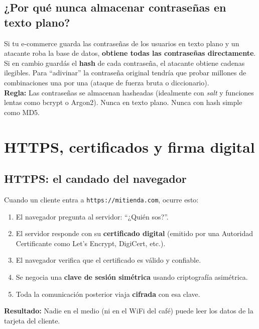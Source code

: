 \documentclass[12pt,a4paper]{article}
\begin{document}
\subsection{¿Por qu\'e nunca almacenar contrase\~nas en texto plano?}

\begin{cajaNota}
Si tu e-commerce guarda las contrase\~nas de los usuarios en texto plano y un atacante roba la base de datos, \textbf{obtiene todas las contrase\~nas directamente}.\\[4pt]
Si en cambio guard\'as el \textbf{hash} de cada contrase\~na, el atacante obtiene cadenas ilegibles. Para ``adivinar'' la contraseña original tendr\'ia que probar millones de combinaciones una por una (ataque de fuerza bruta o diccionario).\\[4pt]
\textbf{Regla:} Las contrase\~nas se almacenan hasheadas (idealmente con \emph{salt} y funciones lentas como bcrypt o Argon2). Nunca en texto plano. Nunca con hash simple como MD5.
\end{cajaNota}

\newpage
\section{HTTPS, certificados y firma digital}

\subsection{HTTPS: el candado del navegador}

\begin{cajaConcepto}[title={¿Qu\'e pasa cuando ves el candadito?}]
Cuando un cliente entra a \texttt{https://mitienda.com}, ocurre esto:
\begin{enumerate}[leftmargin=2em]
  \item El navegador pregunta al servidor: ``¿Qui\'en sos?''.
  \item El servidor responde con su \textbf{certificado digital} (emitido por una Autoridad Certificante como Let's Encrypt, DigiCert, etc.).
  \item El navegador verifica que el certificado es v\'alido y confiable.
  \item Se negocia una \textbf{clave de sesi\'on sim\'etrica} usando criptograf\'ia asim\'etrica.
  \item Toda la comunicaci\'on posterior viaja \textbf{cifrada} con esa clave.
\end{enumerate}
\textbf{Resultado:} Nadie en el medio (ni en el WiFi del café) puede leer los datos de la tarjeta del cliente.
\end{cajaConcepto}
\end{document}
